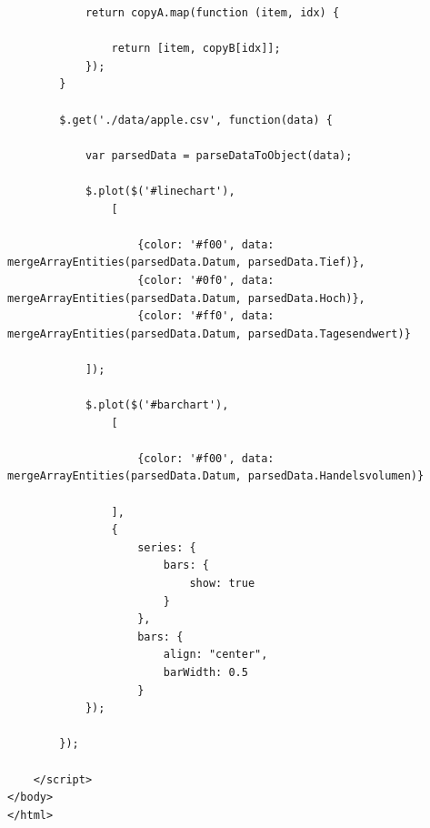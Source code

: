 \begin{itemize}
\begin{lstlisting}
			return copyA.map(function (item, idx) {

				return [item, copyB[idx]];
			});
		}

		$.get('./data/apple.csv', function(data) {

			var parsedData = parseDataToObject(data);
			
			$.plot($('#linechart'), 
				[

					{color: '#f00', data: mergeArrayEntities(parsedData.Datum, parsedData.Tief)},
					{color: '#0f0', data: mergeArrayEntities(parsedData.Datum, parsedData.Hoch)},
					{color: '#ff0', data: mergeArrayEntities(parsedData.Datum, parsedData.Tagesendwert)}

			]);

			$.plot($('#barchart'), 
				[

					{color: '#f00', data: mergeArrayEntities(parsedData.Datum, parsedData.Handelsvolumen)}

				], 
				{
		            series: {
		                bars: {
		                    show: true
		                }
		            },
		            bars: {
		                align: "center",
		                barWidth: 0.5
		            }
			});

		});

	</script>
</body>
</html>

\end{lstlisting}


\end{itemize}




